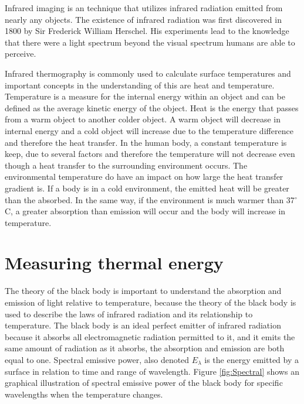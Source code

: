 

Infrared imaging is an technique that utilizes infrared radiation emitted from nearly any objects. 
The existence of infrared radiation was first discovered in 1800 by Sir Frederick William Herschel. 
His experiments lead to the knowledge that there were a light spectrum beyond the visual spectrum humans are able to perceive.\cite{ignacio2017,optris2009}

Infrared thermography is commonly used to calculate surface temperatures and important concepts in the understanding of this are heat and temperature. 
Temperature is a measure for the internal energy within an object and can be defined as the average kinetic energy of the object.
Heat is the energy that passes from a warm object to another colder object. A warm object will decrease in internal energy and a cold object will increase due to the temperature difference and therefore the heat transfer. In the human body, a constant temperature is keep, due to several factors and therefore the temperature will not decrease even though a heat transfer to the surrounding environment occurs. The environmental temperature do have an impact on how large the heat transfer gradient is. If a body is in a cold environment, the emitted heat will be greater than the absorbed. In the same way, if the environment is much warmer than 37$^{\circ}$C, a greater absorption than emission will occur and the body will increase in temperature.\cite{ignacio2017} 

\section{Measuring thermal energy}

The theory of the black body is important to understand the absorption and emission of light relative to temperature, because the theory of the black body is used to describe the laws of infrared radiation and its relationship to temperature. The black body is an ideal perfect emitter of infrared radiation because it absorbs all electromagnetic radiation permitted to it, and it emits the same amount of radiation as it absorbs, the absorption and emission are both equal to one. 
Spectral emissive power, also denoted $E_\lambda$ is the energy emitted by a surface in relation to time and range of wavelength. Figure \ref{fig:Spectral} shows an graphical illustration of spectral emissive power of the black body for specific wavelengths when the temperature changes. \cite{ignacio2017} 

